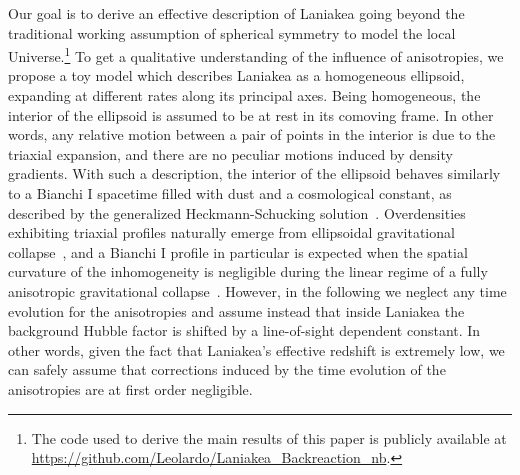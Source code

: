 \documentclass[notitlepage,nofootinbib]{revtex4-1}
\begin{document}
Our goal is to derive an effective description of Laniakea going beyond the traditional working assumption of spherical symmetry to model the local Universe.\footnote{The code used to derive the main results of this paper is publicly available at \href{https://github.com/Leolardo/Laniakea_Backreaction_nb}{https://github.com/Leolardo/Laniakea\_Backreaction\_nb}.} To get a qualitative understanding of the influence of anisotropies, we propose a toy model which describes Laniakea as a homogeneous ellipsoid, expanding at different rates along its principal axes. Being homogeneous, the interior of the ellipsoid is assumed to be at rest in its comoving frame. In other words, any relative motion between a pair of points in the interior is due to the triaxial expansion, and there are no peculiar motions induced by density gradients.
With such a description, the interior of the ellipsoid behaves similarly to a Bianchi I spacetime filled with dust and a cosmological constant, as described by the generalized Heckmann-Schucking solution~\cite{Kamenshchik:2009dt}. Overdensities exhibiting triaxial profiles naturally emerge from ellipsoidal gravitational collapse~\cite{Sheth:1999su,Angrick:2010qg}, and a Bianchi I profile in particular is expected when the spatial curvature of the inhomogeneity is negligible during the linear regime of a fully anisotropic gravitational collapse~\cite{Giani:2021gbs,Giani:2022wda}. 
However, in the following we neglect any time evolution for the anisotropies and assume instead that inside Laniakea the background Hubble factor is shifted by a line-of-sight dependent constant. In other words, given the fact that Laniakea's effective redshift is extremely low, we can safely assume that corrections induced by the time evolution of the anisotropies are at first order negligible. 

\end{document}
